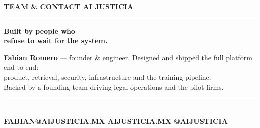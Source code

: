 \documentclass[aspectratio=169,11pt]{beamer}
\begin{document}
\begingroup
{}
\begin{frame}[plain]
  \vspace{0.2cm}
  {\color{mint}\footnotesize\bfseries TEAM \& CONTACT \hfill \textnormal{\color{muted}AI JUSTICIA}}\\[2pt]
  {\color{emeralddeep}\rule{\textwidth}{0.8pt}}
  \vfill
  {\fontsize{27}{33}\selectfont\bfseries\color{white}Built by people who\\ refuse to wait for \color{mint}the system.}
  \vspace{14pt}

  {\small\color{white!75!bgdark}\textbf{\color{white}Fabian Romero} — founder \& engineer. Designed and shipped the full platform end to end:\\
  product, retrieval, security, infrastructure and the training pipeline.\\
  \color{muted}Backed by a founding team driving legal operations and the pilot firms.}
  \vfill

  {\color{emeralddeep}\rule{\textwidth}{0.8pt}}\\[3pt]
  {\tiny\bfseries\color{muted}FABIAN@AIJUSTICIA.MX \hfill AIJUSTICIA.MX \hfill @AIJUSTICIA}
\end{frame}
\endgroup
\end{document}
